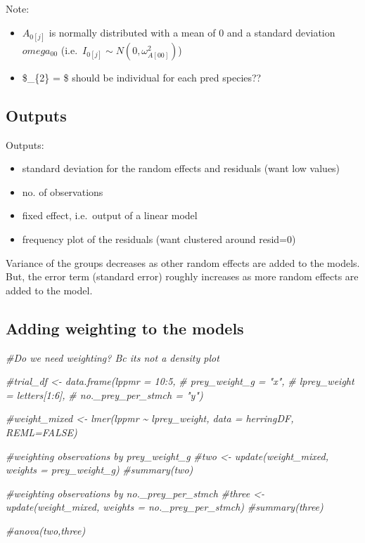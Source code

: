 \documentclass[
]{article}
\newenvironment{Shaded}{\begin{snugshade}}{\end{snugshade}}
\newcommand{\CommentTok}[1]{\textcolor[rgb]{0.56,0.35,0.01}{\textit{#1}}}
\providecommand{\tightlist}{%
  \setlength{\itemsep}{0pt}\setlength{\parskip}{0pt}}
\begin{document}
Note:

\begin{itemize}
\tightlist
\item
  \(A_{0[j]}\) is normally distributed with a mean of \(0\) and a
  standard deviation \(omega_{00}\)
  (i.e.~\(I_{0[j]} \sim N(0,\omega_{A[00]}^2)\))
\item
  \$\beta\_\{2\} = \$ should be individual for each pred species??
\end{itemize}

\hypertarget{outputs}{%
\subsection{Outputs}\label{outputs}}

Outputs:

\begin{itemize}
\tightlist
\item
  standard deviation for the random effects and residuals (want low
  values)
\item
  no. of observations
\item
  fixed effect, i.e.~output of a linear model
\item
  frequency plot of the residuals (want clustered around resid=0)
\end{itemize}

Variance of the groups decreases as other random effects are added to
the models. But, the error term (standard error) roughly increases as
more random effects are added to the model.

\hypertarget{adding-weighting-to-the-models}{%
\subsection{Adding weighting to the
models}\label{adding-weighting-to-the-models}}

\begin{Shaded}
\begin{Highlighting}[]
\CommentTok{\#Do we need weighting? Bc it\textquotesingle{}s not a density plot}

\CommentTok{\#trial\_df \textless{}{-} data.frame(lppmr = 10:5,                }
\CommentTok{\#                 prey\_weight\_g = "x",}
\CommentTok{\#                 lprey\_weight = letters[1:6],}
\CommentTok{\#                 no.\_prey\_per\_stmch = "y")}
          
\CommentTok{\#weight\_mixed \textless{}{-} lmer(lppmr \textasciitilde{} lprey\_weight, data = herringDF, REML=FALSE)}

\CommentTok{\#weighting observations by prey\_weight\_g}
\CommentTok{\#two \textless{}{-} update(weight\_mixed, weights = prey\_weight\_g)}
\CommentTok{\#summary(two)}

\CommentTok{\#weighting observations by no.\_prey\_per\_stmch}
\CommentTok{\#three \textless{}{-} update(weight\_mixed, weights = no.\_prey\_per\_stmch)}
\CommentTok{\#summary(three)}

\CommentTok{\#anova(two,three)}
\end{Highlighting}
\end{Shaded}
\end{document}
